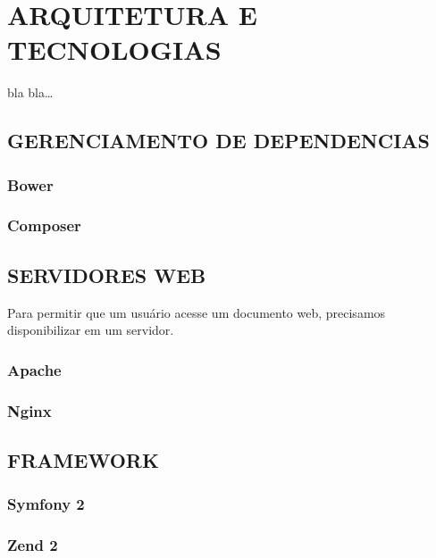 \chapter{ARQUITETURA E TECNOLOGIAS}
\label{tecnologias}

bla bla\ldots








\section{GERENCIAMENTO DE DEPENDENCIAS}
\subsection{Bower}
\subsection{Composer}

\section{SERVIDORES WEB}
Para permitir que um usuário acesse um documento web, precisamos disponibilizar
em um servidor. %

\subsection{Apache}
\subsection{Nginx}

\section{FRAMEWORK}
\subsection{Symfony 2}
\subsection{Zend 2}


